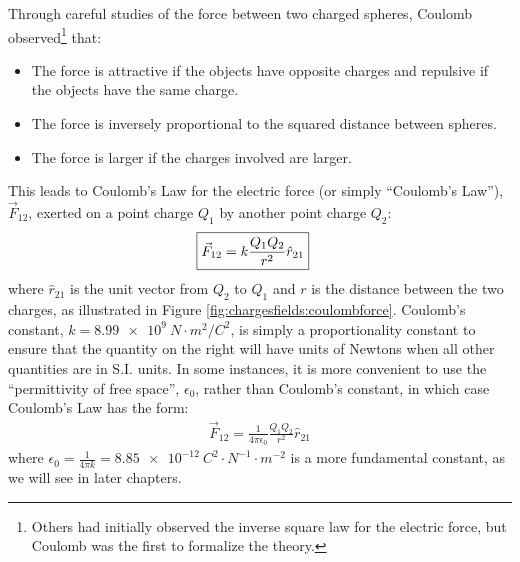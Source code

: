 Through careful studies of the force between two charged spheres, Coulomb observed\footnote{Others had initially observed the inverse square law for the electric force, but Coulomb was the first to formalize the theory.} that:
\begin{itemize}
\item The force is attractive if the objects have opposite charges and repulsive if the objects have the same charge.
\item The force is inversely proportional to the squared distance between spheres.
\item The force is larger if the charges involved are larger. 
\end{itemize}
This leads to Coulomb's Law for the electric force (or simply ``Coulomb's Law''), $\vec F_{12}$, exerted on a point charge $Q_1$ by another point charge $Q_2$:
\begin{align*}
\Aboxed{\vec F_{12}=k\frac{Q_1Q_2}{r^2}\hat r_{21}}
\end{align*}
where $\hat r_{21}$ is the unit vector from $Q_2$ to $Q_1$ and $r$ is the distance between the two charges, as illustrated in Figure \ref{fig:chargesfields:coulombforce}. Coulomb's constant, $k=\SI{8.99e9}{N\cdot m^2/C^{2}}$, is simply a proportionality constant to ensure that the quantity on the right will have units of Newtons when all other quantities are in S.I. units. In some instances, it is more convenient to use the ``permittivity of free space'', $\epsilon_0$, rather than Coulomb's constant, in which case Coulomb's Law has the form:
\begin{align*}
\vec F_{12}=\frac{1}{4\pi\epsilon_0}\frac{Q_1Q_2}{r^2}\hat r_{21}
\end{align*}
where $\epsilon_0=\frac{1}{4\pi k}=\SI{8.85e-12}{C^2\cdot N^{-1}\cdot m^{-2}}$ is a more fundamental constant, as we will see in later chapters.

